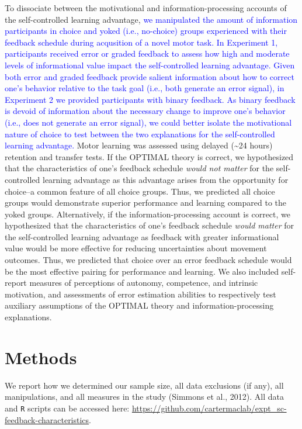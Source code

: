 \documentclass[
  man, donotrepeattitle,floatsintext]{apa7}
\begin{document}
To dissociate between the motivational and information-processing accounts of the self-controlled learning advantage, \textcolor{blue}{we manipulated the amount of information participants in choice and yoked (i.e., no-choice) groups experienced with their feedback schedule during acqusition of a novel motor task. In Experiment 1, participants received error or graded feedback to assess how high and moderate levels of informational value impact the self-controlled learning advantage. Given both error and graded feedback provide salient information about how to correct one's behavior relative to the task goal (i.e., both generate an error signal), in Experiment 2 we provided participants with binary feedback. As binary feedback is devoid of information about the necessary change to improve one's behavior (i.e., does not generate an error signal), we could better isolate the motivational nature of choice to test between the two explanations for the self-controlled learning advantage.} Motor learning was assessed using delayed (\textasciitilde24 hours) retention and transfer tests. If the OPTIMAL theory is correct, we hypothesized that the characteristics of one's feedback schedule \emph{would not matter} for the self-controlled learning advantage as this advantage arises from the opportunity for choice--a common feature of all choice groups. Thus, we predicted all choice groups would demonstrate superior performance and learning compared to the yoked groups. Alternatively, if the information-processing account is correct, we hypothesized that the characteristics of one's feedback schedule \emph{would matter} for the self-controlled learning advantage as feedback with greater informational value would be more effective for reducing uncertainties about movement outcomes. Thus, we predicted that choice over an error feedback schedule would be the most effective pairing for performance and learning. We also included self-report measures of perceptions of autonomy, competence, and intrinsic motivation, and assessments of error estimation abilities to respectively test auxiliary assumptions of the OPTIMAL theory and information-processing explanations.

\hypertarget{methods}{%
\section{Methods}\label{methods}}

We report how we determined our sample size, all data exclusions (if any), all manipulations, and all measures in the study (Simmons et al., 2012). All data and \texttt{R} scripts can be accessed here: \url{https://github.com/cartermaclab/expt_sc-feedback-characteristics}.
\end{document}
